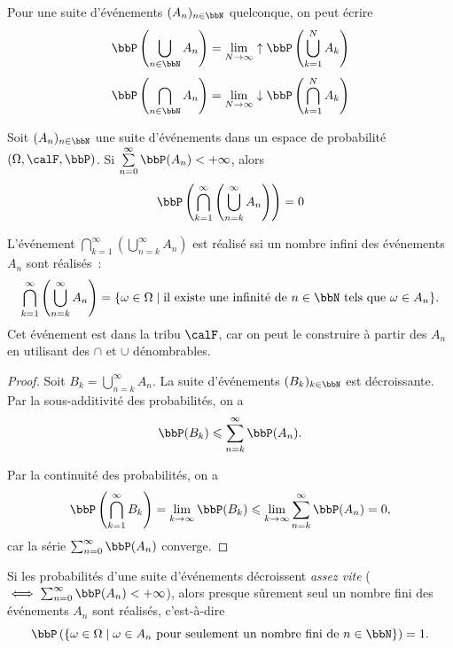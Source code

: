 \begin{rqq}
    Pour une suite d'événements $(A_n)_{n \in \bbN}$ quelconque, on peut écrire
    \[ \bbP \left(\bigcup\limits_{n \in \bbN} A_n\right) = \lim\limits_{N \to \infty} \uparrow \bbP \left(\bigcup\limits_{k = 1}^N A_k\right) \]
    \[ \bbP \left(\bigcap\limits_{n \in \bbN} A_n\right) = \lim\limits_{N \to \infty} \downarrow \bbP \left(\bigcap\limits_{k = 1}^N A_k\right) \]
\end{rqq}

\begin{lem}
    Soit $(A_n)_{n \in \bbN}$ une suite d'événements dans un espace de probabilité $(\Omega, \calF, \bbP)$.
    Si $\sum\limits_{n = 0}^\infty \bbP(A_n) < +\infty$, alors
    \[ \bbP \left(\bigcap\limits_{k = 1}^\infty \left(\bigcup\limits_{n = k}^\infty A_n\right)\right) = 0 \]
\end{lem}

\begin{rqq}
    L'événement $\bigcap_{k = 1}^\infty \left(\bigcup_{n = k}^\infty A_n\right)$ est réalisé
    ssi un nombre infini des événements $A_n$ sont réalisés~:
    \[ \bigcap_{k = 1}^\infty \left(\bigcup_{n = k}^\infty A_n\right) =
        \{ \omega \in \Omega \mid \text{il existe une infinité de } n \in \bbN \text{ tels que } \omega \in A_n \}. \]
    Cet événement est dans la tribu $\calF$,
    car on peut le construire à partir des $A_n$ en utilisant des $\cap$ et $\cup$ dénombrables.
\end{rqq}

\begin{proof}
    Soit $B_k = \bigcup_{n = k}^\infty A_n$.
    La suite d'événements $(B_k)_{k \in \bbN}$ est décroissante.
    Par la sous-additivité des probabilités, on a
    \[ \bbP(B_k) \leqslant \sum_{n = k}^\infty \bbP(A_n). \]

    Par la continuité des probabilités, on a
    \[ \bbP\left(\bigcap_{k = 1}^\infty B_k\right)
        = \lim_{k \to \infty} \bbP(B_k)
        \leqslant \lim_{k \to \infty} \sum_{n = k}^\infty \bbP(A_n)
        = 0, \]
    car la série $\sum_{n = 0}^\infty \bbP(A_n)$ converge.
\end{proof}

\begin{rqq}
    Si les probabilités d'une suite d'événements décroissent \textit{assez vite}
    ($\iff \sum_{n = 0}^\infty \bbP(A_n) < +\infty$),
    alors presque sûrement seul un nombre fini des événements $A_n$ sont réalisés, c'est-à-dire
    \[ \bbP\left(\{ \omega \in \Omega \mid \omega \in A_n \text{ pour seulement un nombre fini de } n \in \bbN \}\right) = 1. \]
\end{rqq}

